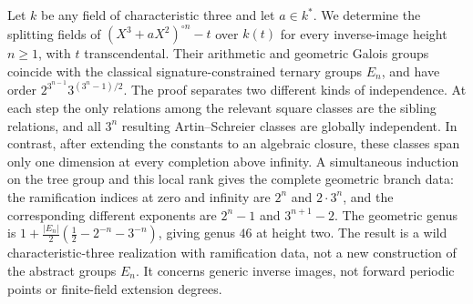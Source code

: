 Let $k$ be any field of characteristic three and let $a\in k^*$.
We determine the splitting fields of
$(X^3+aX^2)^{\circ n}-t$ over $k(t)$ for every inverse-image height
$n\geq1$, with $t$ transcendental. Their arithmetic and geometric
Galois groups coincide with the classical signature-constrained ternary
groups $E_n$, and have order
$2^{3^{n-1}}3^{(3^n-1)/2}$. The proof separates two different kinds of
independence. At each step the only relations among the relevant square
classes are the sibling relations, and all $3^n$ resulting
Artin--Schreier classes are globally independent. In contrast, after
extending the constants to an algebraic closure, these classes span only
one dimension at every completion above infinity. A simultaneous
induction on the tree group and this local rank gives the complete
geometric branch data: the ramification indices at zero and infinity
are $2^n$ and $2\cdot3^n$, and the corresponding different exponents are
$2^n-1$ and $3^{n+1}-2$. The geometric genus is
$1+\frac{|E_n|}{2}(\frac12-2^{-n}-3^{-n})$, giving genus $46$ at height
two. The result is a wild characteristic-three realization with
ramification data, not a new construction of the abstract groups
$E_n$. It concerns generic inverse images, not forward periodic points
or finite-field extension degrees.
